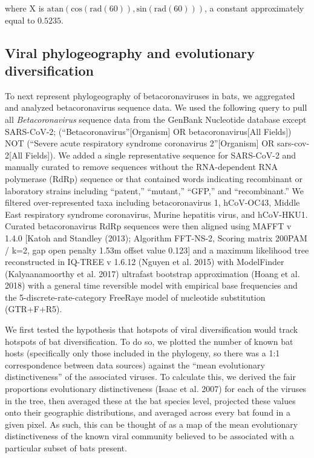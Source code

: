 \documentclass[11pt]{article}
\begin{document}
where X is
\(\text{atan}\left(\text{cos}(\text{rad}(60)), \text{sin}(\text{rad}(60))\right)\),
a constant approximately equal to \(0.5235\).

\hypertarget{viral-phylogeography-and-evolutionary-diversification}{%
\subsection{Viral phylogeography and evolutionary
diversification}\label{viral-phylogeography-and-evolutionary-diversification}}

To next represent phylogeography of betacoronaviruses in bats, we
aggregated and analyzed betacoronavirus sequence data. We used the
following query to pull all \emph{Betacoronavirus} sequence data from
the GenBank Nucleotide database except SARS-CoV-2;
(``Betacoronavirus''{[}Organism{]} OR betacoronavirus{[}All Fields{]})
NOT (``Severe acute respiratory syndrome coronavirus 2''{[}Organism{]}
OR sars-cov-2{[}All Fields{]}). We added a single representative
sequence for SARS-CoV-2 and manually curated to remove sequences without
the RNA-dependent RNA polymerase (RdRp) sequence or that contained words
indicating recombinant or laboratory strains including ``patent,''
``mutant,'' ``GFP,'' and ``recombinant.'' We filtered over-represented
taxa including betacoronavirus 1, hCoV-OC43, Middle East respiratory
syndrome coronavirus, Murine hepatitis virus, and hCoV-HKU1. Curated
betacoronavirus RdRp sequences were then aligned using MAFFT v 1.4.0
{[}Katoh and Standley (2013); Algorithm FFT-NS-2, Scoring matrix 200PAM
/ k=2, gap open penalty 1.53m offset value 0.123{]} and a maximum
likelihood tree reconstructed in IQ-TREE v 1.6.12 (Nguyen et al. 2015)
with ModelFinder (Kalyaanamoorthy et al. 2017) ultrafast bootstrap
approximation (Hoang et al. 2018) with a general time reversible model
with empirical base frequencies and the 5-discrete-rate-category
FreeRaye model of nucleotide substitution (GTR+F+R5).

We first tested the hypothesis that hotspots of viral diversification
would track hotspots of bat diversification. To do so, we plotted the
number of known bat hosts (specifically only those included in the
phylogeny, so there was a 1:1 correspondence between data sources)
against the ``mean evolutionary distinctiveness'' of the associated
viruses. To calculate this, we derived the fair proportions evolutionary
distinctiveness (Isaac et al. 2007) for each of the viruses in the tree,
then averaged these at the bat species level, projected these values
onto their geographic distributions, and averaged across every bat found
in a given pixel. As such, this can be thought of as a map of the mean
evolutionary distinctiveness of the known viral community believed to be
associated with a particular subset of bats present.
\end{document}
